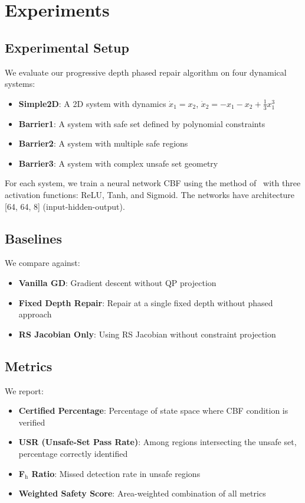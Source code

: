 \section{Experiments}

\subsection{Experimental Setup}

We evaluate our progressive depth phased repair algorithm on four dynamical systems:

\begin{itemize}
    \item \textbf{Simple2D}: A 2D system with dynamics $\dot{x}_1 = x_2$, $\dot{x}_2 = -x_1 - x_2 + \frac{1}{3}x_1^3$
    \item \textbf{Barrier1}: A system with safe set defined by polynomial constraints
    \item \textbf{Barrier2}: A system with multiple safe regions
    \item \textbf{Barrier3}: A system with complex unsafe set geometry
\end{itemize}

For each system, we train a neural network CBF using the method of~\citep{ames2019control} with three activation functions: ReLU, Tanh, and Sigmoid. The networks have architecture [64, 64, 8] (input-hidden-output).

\subsection{Baselines}

We compare against:
\begin{itemize}
    \item \textbf{Vanilla GD}: Gradient descent without QP projection
    \item \textbf{Fixed Depth Repair}: Repair at a single fixed depth without phased approach
    \item \textbf{RS Jacobian Only}: Using RS Jacobian without constraint projection
\end{itemize}

\subsection{Metrics}

We report:
\begin{itemize}
    \item \textbf{Certified Percentage}: Percentage of state space where CBF condition is verified
    \item \textbf{USR (Unsafe-Set Pass Rate)}: Among regions intersecting the unsafe set, percentage correctly identified
    \item \textbf{F$_\text{h}$ Ratio}: Missed detection rate in unsafe regions
    \item \textbf{Weighted Safety Score}: Area-weighted combination of all metrics
\end{itemize}

